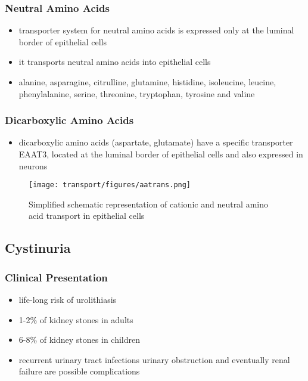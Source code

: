 \documentclass[12pt]{scrartcl}
\begin{document}
\begin{center}
\begin{center}
\subsubsection{Neutral  Amino Acids}
\label{sec:org72e8f7a}
\begin{itemize}
\item transporter system for neutral amino acids is expressed only at the
luminal border of epithelial cells
\item it transports neutral amino acids into epithelial cells
\item alanine, asparagine, citrulline, glutamine, histidine, isoleucine,
leucine, phenylalanine, serine, threonine, tryptophan, tyrosine
and valine
\end{itemize}
\subsubsection{Dicarboxylic Amino Acids}
\label{sec:org2317e50}
\begin{itemize}
\item dicarboxylic amino acids (aspartate, glutamate) have a specific
transporter EAAT3, located at the luminal border
of epithelial cells and also expressed in neurons
\end{itemize}

\begin{figure}[htbp]
\centering
\texttt{[image: transport/figures/aatrans.png]}
\caption{\label{fig:org06613b9}Simplified schematic representation of cationic and neutral amino acid transport in epithelial cells}
\end{figure}

\subsection{Cystinuria}
\label{sec:org432705a}
\subsubsection{Clinical Presentation}
\label{sec:org7c40e9b}
\begin{itemize}
\item life-long risk of urolithiasis
\item 1-2\% of kidney stones in adults
\item 6-8\% of kidney stones in children
\item recurrent urinary tract infections urinary obstruction and
eventually renal failure are possible complications
\end{itemize}


\end{center}
\end{center}
\end{document}
